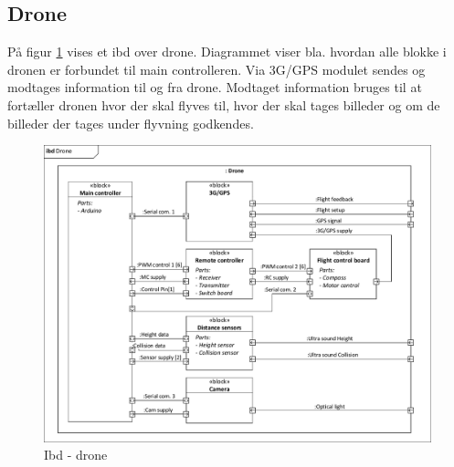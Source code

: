 \subsection{Drone}

På figur \ref{fig:ibd_drone} vises et ibd over drone. Diagrammet viser bla. hvordan alle blokke i dronen er forbundet til main controlleren. Via 3G/GPS modulet sendes og modtages information til og fra drone. Modtaget information bruges til at fortæller dronen hvor der skal flyves til, hvor der skal tages billeder og om de billeder der tages under flyvning godkendes. 

\begin{figure}[H]
\centering
\includegraphics[width=1\textwidth]{Billeder/IBD/ibd2_drone.pdf}
\vspace{-0.5cm}
\caption{Ibd - drone}
\label{fig:ibd_drone}
\end{figure}

